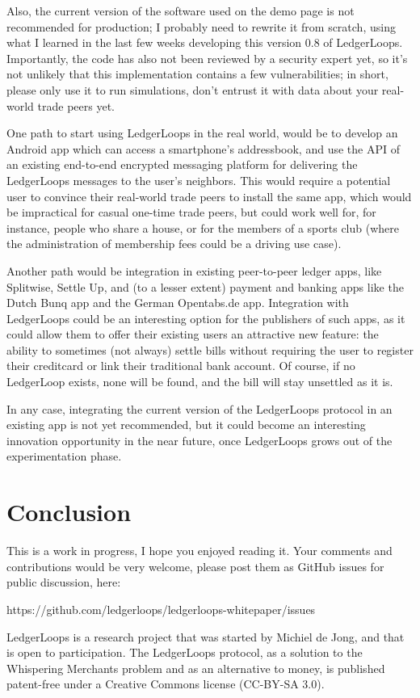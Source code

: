 \documentclass[11pt,twoside,a4paper]{article}
\begin{document}
Also, the current version of the software used on the demo page is not recommended for production; I probably need to rewrite it from scratch, using what I learned in the last few weeks developing this version 0.8 of LedgerLoops. Importantly, the code has also not been reviewed by a security expert yet, so it's not unlikely that this implementation contains a few vulnerabilities; in short, please only use it to run simulations, don't entrust it with data about your real-world trade peers yet.

One path to start using LedgerLoops in the real world, would be to develop an Android app which can access a smartphone's addressbook, and use the API of an existing end-to-end encrypted messaging platform for delivering the LedgerLoops messages to the user's neighbors. This would require a potential user to convince their real-world trade peers to install the same app, which would be impractical for casual one-time trade peers, but could work well for, for instance, people who share a house, or for the members of a sports club (where the administration of membership fees could be a driving use case).

Another path would be integration in existing peer-to-peer ledger apps, like Splitwise, Settle Up, and (to a lesser extent) payment and banking apps like the Dutch Bunq app and the German Opentabs.de app. Integration with LedgerLoops could be an interesting option for the publishers of such apps, as it could allow them to offer their existing users an attractive new feature: the ability to sometimes (not always) settle bills without requiring the user to register their creditcard or link their traditional bank account. Of course, if no LedgerLoop exists, none will be found, and the bill will stay unsettled as it is.

In any case, integrating the current version of the LedgerLoops protocol in an existing app is not yet recommended, but it could become an interesting innovation opportunity in the near future, once LedgerLoops grows out of the experimentation phase.

\section{Conclusion}
This is a work in progress, I hope you enjoyed reading it. Your comments and contributions would be very welcome, please post them as
GitHub issues for public discussion, here:

https://github.com/ledgerloops/ledgerloops-whitepaper/issues

LedgerLoops is a research project that was started by Michiel de Jong, and that is open to participation. The LedgerLoops protocol, as a solution to the Whispering Merchants problem and as an alternative to money, is published patent-free under a Creative Commons license (CC-BY-SA 3.0).


\end{document}

